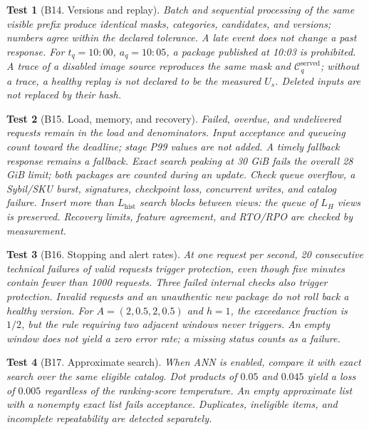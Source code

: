 \documentclass[12pt,a4paper]{article}
\theoremstyle{plainru}
\newtheorem{testcase}{Test}[section]
\begin{document}
\begin{testcase}[B14. Versions and replay]
Batch and sequential processing of the same visible prefix
produce identical masks, categories, candidates, and versions; numbers agree
within the declared tolerance. A late event does not change a past response.
For $t_q=10{:}00$, $a_q=10{:}05$, a package published at 10:03 is prohibited.
A trace of a disabled image source reproduces the same
mask and $\mathcal C_q^{\mathrm{served}}$; without a trace, a healthy replay
is not declared to be the measured $U_s$. Deleted inputs are not replaced by their hash.
\end{testcase}

\begin{testcase}[B15. Load, memory, and recovery]
Failed, overdue, and undelivered requests remain in the load
and denominators. Input acceptance and queueing count toward the deadline; stage P99
values are not added. A timely fallback response remains a fallback.
Exact search peaking at 30 GiB fails the overall 28 GiB limit;
both packages are counted during an update.
Check queue overflow, a Sybil/SKU burst, signatures, checkpoint
loss, concurrent writes, and catalog failure.
Insert more than $L_{\mathrm{hist}}$ search blocks between views:
the queue of $L_H$ views is preserved. Recovery limits,
feature agreement, and RTO/RPO are checked by measurement.
\end{testcase}

\begin{testcase}[B16. Stopping and alert rates]
At one request per second, 20 consecutive technical failures
of valid requests trigger protection, even though five minutes contain fewer than 1000 requests.
Three failed internal checks also trigger protection.
Invalid requests and an unauthentic new package do not roll back a healthy version.
For $A=(2,0.5,2,0.5)$ and $h=1$, the exceedance fraction is $1/2$,
but the rule requiring two adjacent windows never triggers.
An empty window does not yield a zero error rate; a missing status counts as a failure.
\end{testcase}

\begin{testcase}[B17. Approximate search]
When ANN is enabled, compare it with exact search over the same eligible
catalog. Dot products of $0.05$ and $0.045$ yield
a loss of $0.005$ regardless of the ranking-score temperature.
An empty approximate list with a nonempty exact list fails acceptance.
Duplicates, ineligible items, and incomplete repeatability are detected separately.
\end{testcase}
\end{document}
